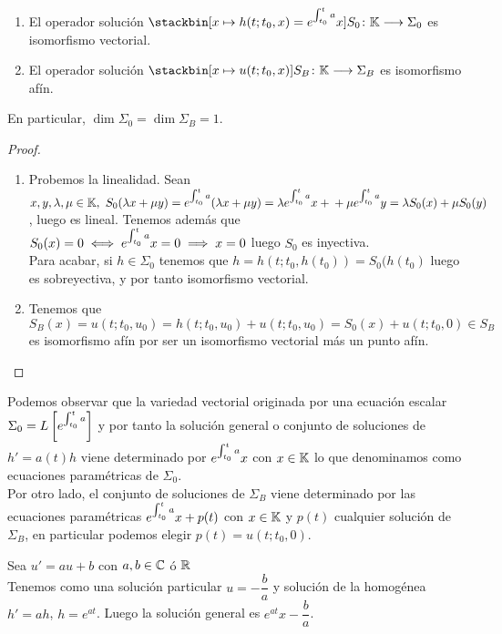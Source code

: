 \begin{teor}\ \begin{enumerate}[1)]
\item El operador solución $\xfunction{S_0}{\K}{\Sigma_0}{x\mapsto h(t;t_0, x)=e^{\inte{t}{t_0}a}x}$ es isomorfismo vectorial.
\item El operador solución $\xfunction{S_B}{\K}{\Sigma_B}{x\mapsto u(t;t_0, x)}$ es isomorfismo afín.
\end{enumerate}
En particular, $\dim\Sigma_0=\dim\Sigma_B=1$.
\begin{proof}\ 
\begin{enumerate}[1)]
\item Probemos la linealidad. Sean $x,y,\lambda,\mu\in\K,\ S_0(\lambda x+\mu y)= e^{\inte{t}{t_0}a}(\lambda x+\mu y)=\lambda e^{\inte{t}{t_0}a}x+\\+\mu e^{\inte{t}{t_0}a}y=\lambda S_0(x)+\mu S_0(y)$, luego es lineal. Tenemos además que\\
$S_0(x)=0\iff e^{\inte{t}{t_0}a}x=0\implies x=0$ luego $S_0$ es inyectiva.\\
Para acabar, si $h\in\Sigma_0$ tenemos que $h=h(t;t_0,h(t_0))=S_0(h(t_0)$ luego es sobreyectiva, y por tanto isomorfismo vectorial.
\item Tenemos que $S_B(x)=u(t;t_0,u_0)=h(t;t_0,u_0)+u(t;t_0,u_0)=S_0(x)+u(t;t_0,0)\in S_B$ es isomorfismo afín por ser un isomorfismo vectorial más un punto afín.
\end{enumerate}
\end{proof}
\end{teor}

\begin{observacion} Podemos observar que la variedad vectorial originada por una ecuación escalar $\Sigma_0=L\left[e^{\inte{t}{t_0}a}\right]$ y por tanto la solución general o conjunto de soluciones de $h'=a(t)h$ viene determinado por $e^{\inte{t}{t_0}a}x$ con $x\in\K$ lo que denominamos como ecuaciones paramétricas de $\Sigma_0$.\\

Por otro lado, el conjunto de soluciones de $\Sigma_B$ viene determinado por las ecuaciones paramétricas
$e^{\inte{t}{t_0}a}x+p(t)$ con $x\in\K$ y $p(t)$ cualquier solución de $\Sigma_B$, en particular podemos elegir $p(t)=u(t;t_0,0)$.
\end{observacion}

\begin{ejem} Sea $u'=au+b$ con $a,b\in \C$ ó $\R$\\
Tenemos como una solución particular $u=-\dfrac{b}{a}$ y solución de la homogénea $h'=ah$, $h=e^{at}$. Luego la solución general es $e^{at}x-\dfrac{b}{a}$.
\end{ejem}


